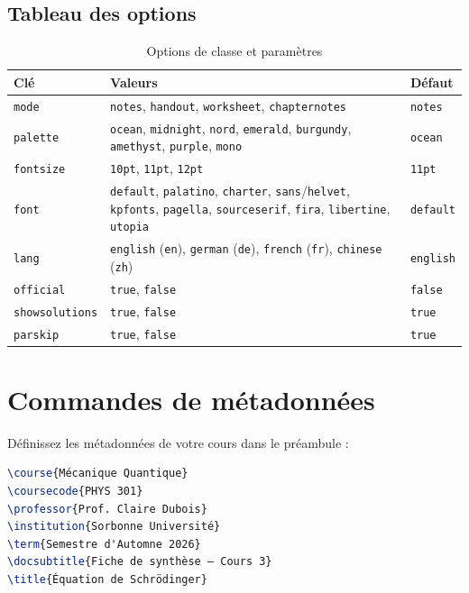 \documentclass[mode=notes, palette=ocean, lang=french, fontsize=11pt]{modernclassnotes}
\begin{document}
\subsection{Tableau des options}
\begin{table}[h]
\centering
\begin{tabular}{l|p{9.5cm}|l}
\toprule
\textbf{Clé} & \textbf{Valeurs} & \textbf{Défaut} \\
\midrule
\texttt{mode} & \texttt{notes}, \texttt{handout}, \texttt{worksheet}, \texttt{chapternotes} & \texttt{notes} \\ \hline
\texttt{palette} & \texttt{ocean}, \texttt{midnight}, \texttt{nord}, \texttt{emerald}, \texttt{burgundy}, \texttt{amethyst}, \texttt{purple}, \texttt{mono} & \texttt{ocean} \\ \hline
\texttt{fontsize} & \texttt{10pt}, \texttt{11pt}, \texttt{12pt} & \texttt{11pt} \\ \hline
\texttt{font} & \texttt{default}, \texttt{palatino}, \texttt{charter}, \texttt{sans}/\texttt{helvet}, \texttt{kpfonts}, \texttt{pagella}, \texttt{sourceserif}, \texttt{fira}, \texttt{libertine}, \texttt{utopia} & \texttt{default} \\ \hline
\texttt{lang} & \texttt{english} (\texttt{en}), \texttt{german} (\texttt{de}), \texttt{french} (\texttt{fr}), \texttt{chinese} (\texttt{zh}) & \texttt{english} \\ \hline
\texttt{official} & \texttt{true}, \texttt{false} & \texttt{false} \\ \hline
\texttt{showsolutions} & \texttt{true}, \texttt{false} & \texttt{true} \\ \hline
\texttt{parskip} & \texttt{true}, \texttt{false} & \texttt{true} \\
\bottomrule
\end{tabular}
\caption{Options de classe et paramètres}
\end{table}

\section{Commandes de métadonnées}

Définissez les métadonnées de votre cours dans le préambule :
\begin{codebox}
\begin{lstlisting}[language=TeX]
\course{Mécanique Quantique}
\coursecode{PHYS 301}
\professor{Prof. Claire Dubois}
\institution{Sorbonne Université}
\term{Semestre d'Automne 2026}
\docsubtitle{Fiche de synthèse – Cours 3}
\title{Équation de Schrödinger}
\end{lstlisting}
\end{codebox}
\end{document}
